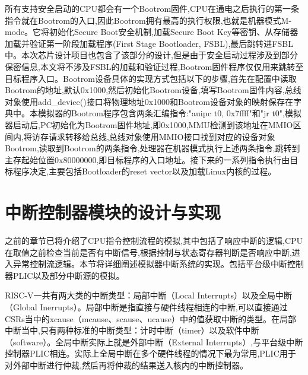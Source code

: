 所有支持安全启动的CPU都会有一个Bootrom固件,CPU在通电之后执行的第一条指令就在Bootrom的入口,因此Bootrom拥有最高的执行权限,也就是机器模式M-mode。它将初始化Secure Boot安全机制,加载Secure Boot Key等密钥、从存储器加载并验证第一阶段加载程序(First Stage Bootloader, FSBL),最后跳转进FSBL中。本次芯片设计项目也包含了该部分的设计,但是由于安全启动过程涉及到部分保密信息,本文将不涉及FSBL的加载和验证过程,Bootrom固件程序仅仅用来跳转至目标程序入口。Bootrom设备具体的实现方式包括以下的步骤,首先在配置中读取Bootrom的地址,默认0x1000,然后初始化Bootrom设备,填写Bootrom固件内容,总线对象使用add\_device()接口将物理地址0x1000和Bootrom设备对象的映射保存在字典中。本模拟器的Bootrom程序包含两条汇编指令:"auipc	t0, 0x7ffff"和"jr 	t0",模拟器启动后,PC初始化为Bootrom固件地址,即0x1000,MMU检测到该地址在MMIO区间内,将访存请求转移给总线,总线对象使用MMIO接口找到对应的设备对象Bootrom,读取到Bootrom的两条指令,处理器在机器模式执行上述两条指令,跳转到主存起始位置0x80000000,即目标程序的入口地址。接下来的一系列指令执行由目标程序决定,主要包括Bootloader的reset vector以及加载Linux内核的过程。

\section{中断控制器模块的设计与实现}

之前的章节已将介绍了CPU指令控制流程的模拟,其中包括了响应中断的逻辑,CPU在取值之前检查当前是否有中断信号,根据控制与状态寄存器判断是否响应中断,进入异常控制流逻辑。本节将详细阐述模拟器中断系统的实现。包括平台级中断控制器PLIC以及部分中断源的模拟。


RISC-V一共有两大类的中断类型：局部中断（Local Interrupts）以及全局中断（Global Inerrupts）。局部中断是指直接与硬件线程相连的中断,可以直接通过CSRs当中的xcause（mcause、scause、ucause）中的值获取中断的类型。在局部中断当中,只有两种标准的中断类型：计时中断（timer）以及软件中断（software）。全局中断实际上就是外部中断（External Interrupts）,与平台级中断控制器PLIC相连。实际上全局中断在多个硬件线程的情况下最为常用,PLIC用于对外部中断进行仲裁,然后再将仲裁的结果送入核内的中断控制器。


